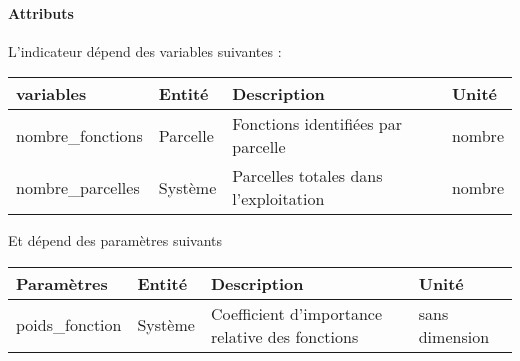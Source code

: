 \documentclass[
]{article}
\begin{document}
\paragraph{Attributs}\label{attributs-32}

L'indicateur dépend des variables suivantes :

\begin{longtable}[]{@{}
  >{\raggedright\arraybackslash}p{}
  >{\raggedright\arraybackslash}p{}
  >{\raggedright\arraybackslash}p{}
  >{\raggedright\arraybackslash}p{}@{}}
\toprule\noalign{}
\begin{minipage}[b]{\linewidth}\raggedright
\textbf{variables}
\end{minipage} & \begin{minipage}[b]{\linewidth}\raggedright
\textbf{Entité}
\end{minipage} & \begin{minipage}[b]{\linewidth}\raggedright
\textbf{Description}
\end{minipage} & \begin{minipage}[b]{\linewidth}\raggedright
\textbf{Unité}
\end{minipage} \\
\midrule\noalign{}
\endhead
\bottomrule\noalign{}
\endlastfoot
nombre\_fonctions & Parcelle & Fonctions identifiées par parcelle &
nombre \\
nombre\_parcelles & Système & Parcelles totales dans l'exploitation &
nombre \\
\end{longtable}

Et dépend des paramètres suivants

\begin{longtable}[]{@{}
  >{\raggedright\arraybackslash}p{}
  >{\raggedright\arraybackslash}p{}
  >{\raggedright\arraybackslash}p{}
  >{\raggedright\arraybackslash}p{}@{}}
\toprule\noalign{}
\begin{minipage}[b]{\linewidth}\raggedright
\textbf{Paramètres}
\end{minipage} & \begin{minipage}[b]{\linewidth}\raggedright
\textbf{Entité}
\end{minipage} & \begin{minipage}[b]{\linewidth}\raggedright
\textbf{Description}
\end{minipage} & \begin{minipage}[b]{\linewidth}\raggedright
\textbf{Unité}
\end{minipage} \\
\midrule\noalign{}
\endhead
\bottomrule\noalign{}
\endlastfoot
poids\_fonction & Système & Coefficient d'importance relative des
fonctions & sans dimension \\
\end{longtable}
\end{document}
